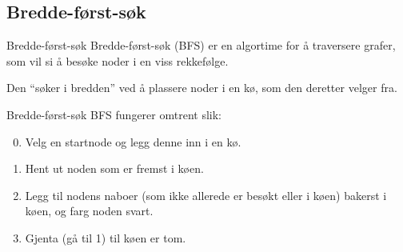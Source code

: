 \documentclass[14pt]{beamer}
\begin{document}
\subsection{Bredde-først-søk}
\begin{frame}{Bredde-først-søk}
    Bredde-først-søk (BFS) er en algortime for å traversere grafer, som vil si å besøke noder i en viss rekkefølge.

    \pause

    Den ``søker i bredden'' ved å plassere noder i en kø, som den deretter velger fra.
\end{frame}
\begin{frame}{Bredde-først-søk}
    BFS fungerer omtrent slik:

    \begin{enumerate}
        \setcounter{enumi}{-1}
        \item<2-> Velg en startnode og legg denne inn i en kø.
        \item<3-> Hent ut noden som er fremst i køen.
        \item<4-> Legg til nodens naboer (som ikke allerede er besøkt eller i køen) bakerst i køen, og farg noden svart.
        \item<5-> Gjenta (gå til 1) til køen er tom.
    \end{enumerate}
\end{frame}
\end{document}
